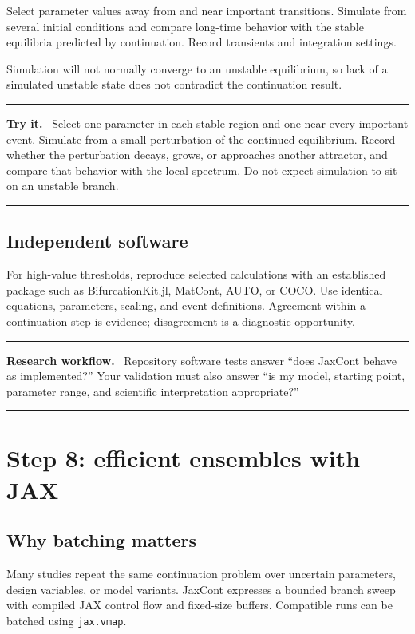 \documentclass[11pt,oneside]{book}
\newenvironment{workflowbox}
  {\par\medskip\noindent\begin{minipage}{\textwidth}
   \color{JaxGreen!70!black}\rule{\textwidth}{0.8pt}\par
   \textbf{Research workflow.}\ \color{black}}
  {\par\color{JaxGreen!70!black}\rule{\textwidth}{0.8pt}
   \end{minipage}\par\medskip}
\newenvironment{trythis}
  {\par\medskip\noindent\begin{minipage}{\textwidth}
   \color{JaxTeal}\rule{\textwidth}{0.8pt}\par
   \textbf{Try it.}\ \color{black}}
  {\par\color{JaxTeal}\rule{\textwidth}{0.8pt}
   \end{minipage}\par\medskip}
\begin{document}
Select parameter values away from and near important transitions. Simulate from
several initial conditions and compare long-time behavior with the stable
equilibria predicted by continuation. Record transients and integration
settings.

Simulation will not normally converge to an unstable equilibrium, so lack of a
simulated unstable state does not contradict the continuation result.

\begin{trythis}
Select one parameter in each stable region and one near every important event.
Simulate from a small perturbation of the continued equilibrium. Record whether
the perturbation decays, grows, or approaches another attractor, and compare
that behavior with the local spectrum. Do not expect simulation to sit on an
unstable branch.
\end{trythis}

\section{Independent software}

For high-value thresholds, reproduce selected calculations with an established
package such as BifurcationKit.jl, MatCont, AUTO, or COCO. Use identical
equations, parameters, scaling, and event definitions. Agreement within a
continuation step is evidence; disagreement is a diagnostic opportunity.

\begin{workflowbox}
Repository software tests answer ``does JaxCont behave as implemented?'' Your
validation must also answer ``is my model, starting point, parameter range, and
scientific interpretation appropriate?''
\end{workflowbox}

\chapter{Step 8: efficient ensembles with JAX}

\section{Why batching matters}

Many studies repeat the same continuation problem over uncertain parameters,
design variables, or model variants. JaxCont expresses a bounded branch sweep
with compiled JAX control flow and fixed-size buffers. Compatible runs can be
batched using \texttt{jax.vmap}.
\end{document}
